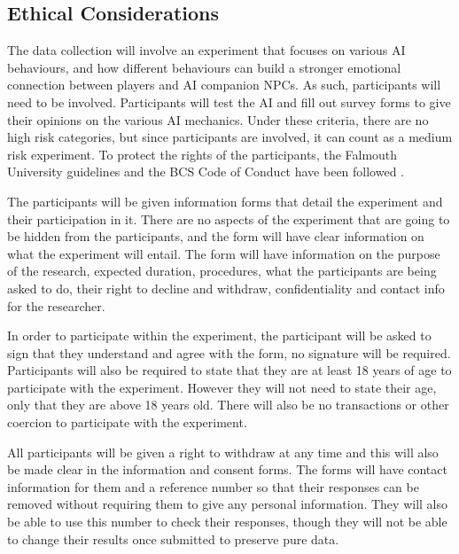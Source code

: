 \documentclass{IEEEtran}
\begin{document}

\subsection{Ethical Considerations}
\label{EthicalConsiderations}

The data collection will involve an experiment that focuses on various AI behaviours, and how different behaviours can build a stronger emotional connection between players and AI companion NPCs. As such, participants will need to be involved. Participants will test the AI and fill out survey forms to give their opinions on the various AI mechanics. Under these criteria, there are no high risk categories, but since participants are involved, it can count as a medium risk experiment. To protect the rights of the participants, the Falmouth University guidelines and the BCS Code of Conduct have been followed \cite{BCSConductCode}.

The participants will be given information forms that detail the experiment and their participation in it. There are no aspects of the experiment that are going to be hidden from the participants, and the form will have clear information on what the experiment will entail. The form will have information on the purpose of the research, expected duration, procedures, what the participants are being asked to do, their right to decline and withdraw, confidentiality and contact info for the researcher.

In order to participate within the experiment, the participant will be asked to sign that they understand and agree with the form, no signature will be required. Participants will also be required to state that they are at least 18 years of age to participate with the experiment. However they will not need to state their age, only that they are above 18 years old. There will also be no transactions or other coercion to participate with the experiment.

All participants will be given a right to withdraw at any time and this will also be made clear in the information and consent forms. The forms will have contact information for them and a reference number so that their responses can be removed without requiring them to give any personal information. They will also be able to use this number to check their responses, though they will not be able to change their results once submitted to preserve pure data.
\end{document}
